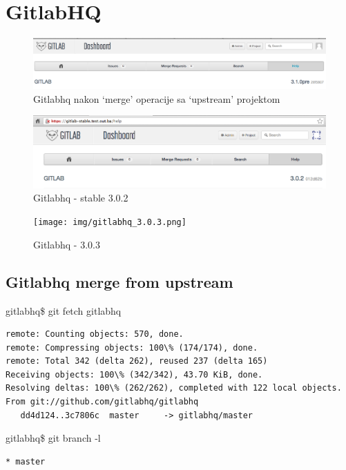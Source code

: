 \section{GitlabHQ}

\begin{figure}[H]
\centering
\includegraphics[width=15cm]{img/gitlab_hernad_310_after_merge.png}
\caption{Gitlabhq nakon `merge' operacije sa `upstream' projektom}
\end{figure}

\begin{figure}[H]
\centering
\includegraphics[width=15cm]{img/gitlab_stable_3.0.2.png}
\caption{Gitlabhq - stable 3.0.2}
\end{figure}


\begin{figure}[H]
\centering
\texttt{[image: img/gitlabhq\_3.0.3.png]}
\caption{Gitlabhq - 3.0.3}
\end{figure}



\subsection{Gitlabhq merge from upstream}

gitlabhq\$ git fetch gitlabhq

\begin{lstlisting}
remote: Counting objects: 570, done.
remote: Compressing objects: 100\% (174/174), done.
remote: Total 342 (delta 262), reused 237 (delta 165)
Receiving objects: 100\% (342/342), 43.70 KiB, done.
Resolving deltas: 100\% (262/262), completed with 122 local objects.
From git://github.com/gitlabhq/gitlabhq
   dd4d124..3c7806c  master     -> gitlabhq/master
\end{lstlisting}


gitlabhq\$ git branch -l

\begin{lstlisting}
* master
\end{lstlisting}


